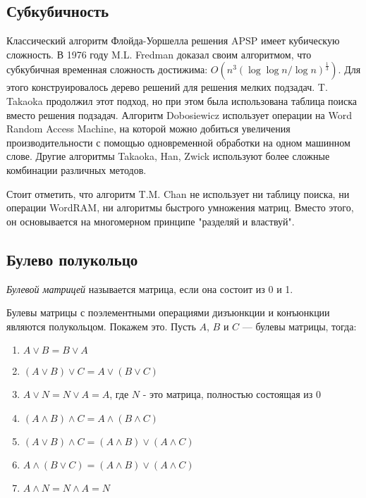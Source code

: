 \subsection{Субкубичность}

Классический алгоритм Флойда-Уоршелла решения APSP имеет кубическую сложность. 
В 1976 году M.L. Fredman доказал своим алгоритмом, что субкубичная временная сложность достижима: $O(n^3(\log \log n / \log n)^\frac{1}{3})$. Для этого конструировалось дерево решений для решения мелких подзадач.
T. Takaoka продолжил этот подход, но при этом была использована таблица поиска вместо решения подзадач.
Алгоритм Dobosiewicz использует операции на Word Random Access Machine, на которой можно добиться увеличения производительности с помощью одновременной обработки на одном машинном слове.
Другие алгоритмы Takaoka, Han, Zwick используют более сложные комбинации различных методов.

Стоит отметить, что алгоритм T.M. Chan не использует ни таблицу поиска, ни операции WordRAM, ни алгоритмы быстрого умножения матриц. Вместо этого, он основывается на многомерном принципе "разделяй и властвуй". \cite{Chan2008}

\subsection{Булево полукольцо}
\begin{definition}
  \textit{Булевой матрицей} называется матрица, если она состоит из 0 и 1.
\end{definition}

Булевы матрицы с поэлементными операциями дизъюнкции и конъюнкции являются полукольцом. Покажем это. Пусть $A$, $B$ и $C$ --- булевы матрицы, тогда:
\begin{enumerate}
    \item $A \vee B = B \vee A$
    \item $(A \vee B) \vee C = A \vee (B \vee C)$
    \item $A \vee N = N \vee A = A$, где $N$ - это матрица, полностью состоящая из 0
    
    \item $(A \wedge B) \wedge C = A \wedge (B \wedge C)$
    
    \item $(A \vee B) \wedge C = (A \wedge B) \vee (A \wedge C)$
    \item $A \wedge (B \vee C) = (A \wedge B) \vee (A \wedge C)$
    
    \item $A \wedge N = N \wedge A = N$
\end{enumerate}

